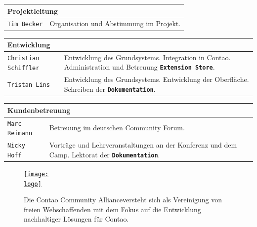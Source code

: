 \documentclass[
paper=a4,
draft=false,%
fontsize=10pt%
]{scrartcl}
\def\logo{logos/colorlogo_rgb}%
\newcommand{\store}{\textbf{\texttt{Extension Store}}}
\newcommand{\documentation}{\textbf{\texttt{Dokumentation}}}
\begin{document}
\begin{tabularx}{\textwidth}{p{}X}
\multicolumn{2}{l}{\textbf{Projektleitung}} \\
\hline
\texttt{Tim Becker}          & Organisation und Abstimmung im Projekt. \\
\end{tabularx}

\begin{tabularx}{\textwidth}{p{}X}
\multicolumn{2}{l}{\textbf{Entwicklung}} \\
\hline
\texttt{Christian Schiffler} & Entwicklung des Grundsystems. \newline
                               Integration in Contao. \newline
                               Administration und Betreuung \store{}. \\
\texttt{Tristan Lins}        & Entwicklung des Grundsystems. \newline
                               Entwicklung der Oberfläche. \newline
                               Schreiben der \documentation{}.
\end{tabularx}

\begin{tabularx}{\textwidth}{p{}X}
\multicolumn{2}{l}{\textbf{Kundenbetreuung}} \\
\hline
\texttt{Marc Reimann}        & Betreuung im deutschen Community Forum. \\
\texttt{Nicky Hoff}          & Vorträge und Lehrveranstaltungen an der Konferenz und dem Camp. \newline
                               Lektorat der \documentation{}. \\
\end{tabularx}

\begin{figure}[h]
\begin{center}
\href{http://c-c-a.org}{\texttt{[image: \\logo]}}
\end{center}
\begin{emquotation}
Die Contao Community Alliance\footnotemark versteht sich als Vereinigung von freien Webschaffenden mit dem Fokus auf die Entwicklung nachhaltiger Lösungen für Contao.
\end{emquotation}
\end{figure}

\end{document}
